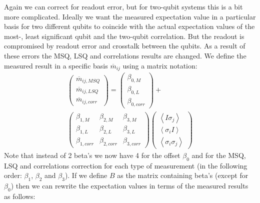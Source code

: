 Again we can correct for readout error, but for two-qubit systems this is a bit more complicated. Ideally we want the measured expectation value in a particular basis for two different qubits to coincide with the actual expectation values of the most-, least significant qubit and the two-qubit correlation. But the readout is compromised by readout error and crosstalk between the qubits. As a result of these errors the MSQ, LSQ and correlations results are changed. We define the measured result in a specific basis $\overline{m}_{ij}$ using a matrix notation:
\begin{equation}
\label{beta}
\begin{split}
\begin{pmatrix}
\overline{m}_{ij,MSQ}  \\
\overline{m}_{ij,LSQ}  \\
\overline{m}_{ij,corr}
\end{pmatrix}=\begin{pmatrix}
\beta_{0,M}  \\
\beta_{0,L}  \\
\beta_{0,corr}
\end{pmatrix}+\\\begin{pmatrix}
\beta_{1,M}&\beta_{2,M}&\beta_{3,M}  \\
\beta_{1,L}&\beta_{2,L}&\beta_{3,L}  \\
\beta_{1,corr}&\beta_{2,corr}&\beta_{3,corr}
\end{pmatrix}\begin{pmatrix}
\left\langle I\sigma_j\right\rangle  \\
\left\langle \sigma_iI\right\rangle  \\
\left\langle \sigma_i\sigma_j\right\rangle
\end{pmatrix}
\end{split}
\end{equation}
Note that instead of 2 beta's we now have 4 for the offset $\beta_0$ and for the MSQ, LSQ and correlations correction for each type of measurement (in the following order: $\beta_1$, $\beta_2$ and $\beta_3$). If we define $B$ as the matrix containing beta's (except for $\beta_0$) then we can rewrite the expectation values in terms of the measured results as follows:
